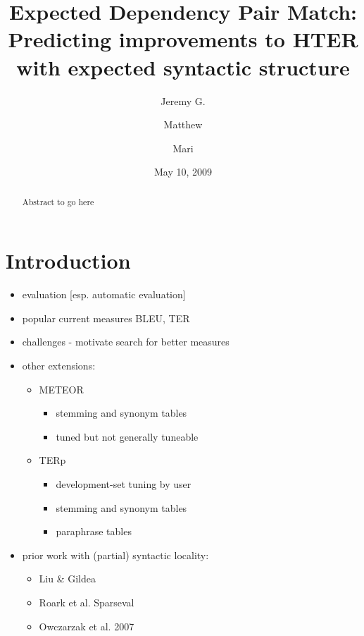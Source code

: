 \documentclass{kluwer}    %
\begin{document}
                                                                                   
\begin{article}
\begin{opening}         
\title{Expected Dependency Pair Match:\\
Predicting improvements to {HTER} with expected syntactic structure} 
\author{Jeremy G. }  
\author{Matthew }
\author{Mari }  
\date{May 10, 2009}

\begin{abstract}
Abstract to go here
\end{abstract}

\end{opening}           

\section{Introduction}

\begin{itemize}
\item evaluation [esp. automatic evaluation]
\item popular current
  measures BLEU, TER

\item challenges - motivate search for better measures

\item other extensions:
  \begin{itemize}
  \item METEOR 
    \begin{itemize}
    \item stemming and synonym tables
    \item tuned but not generally     tuneable
    \end{itemize}
  \item TERp
    \begin{itemize}
    \item development-set tuning by user
    \item stemming and synonym tables
    \item paraphrase tables
    \end{itemize}
  \end{itemize}
\item prior work with (partial) syntactic locality:
  \begin{itemize}
  \item Liu \& Gildea 
  \item Roark et al. Sparseval
  \item Owczarzak et al. 2007
  \end{itemize}



\end{itemize}
\end{article}
\end{document}
